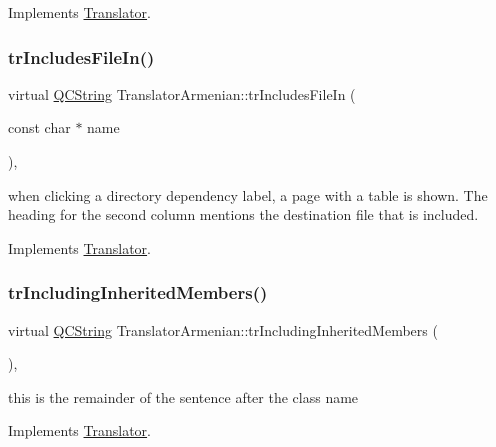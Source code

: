 Implements \mbox{\hyperlink{class_translator}{Translator}}.

\mbox{\label{class_translator_armenian_af2a4a618cdf3af2ac4be6779c2b79896}} 
\subsubsection{\texorpdfstring{trIncludesFileIn()}{trIncludesFileIn()}}
{\footnotesize\ttfamily virtual \mbox{\hyperlink{class_q_c_string}{Q\+C\+String}} Translator\+Armenian\+::tr\+Includes\+File\+In (\begin{DoxyParamCaption}\item[{const char $\ast$}]{name }\end{DoxyParamCaption})\hspace{0.3cm}{\ttfamily [inline]}, {\ttfamily [virtual]}}

when clicking a directory dependency label, a page with a table is shown. The heading for the second column mentions the destination file that is included. 

Implements \mbox{\hyperlink{class_translator}{Translator}}.

\mbox{\label{class_translator_armenian_a97f47188715dd990060fd63c25baaf94}} 
\subsubsection{\texorpdfstring{trIncludingInheritedMembers()}{trIncludingInheritedMembers()}}
{\footnotesize\ttfamily virtual \mbox{\hyperlink{class_q_c_string}{Q\+C\+String}} Translator\+Armenian\+::tr\+Including\+Inherited\+Members (\begin{DoxyParamCaption}{ }\end{DoxyParamCaption})\hspace{0.3cm}{\ttfamily [inline]}, {\ttfamily [virtual]}}

this is the remainder of the sentence after the class name 

Implements \mbox{\hyperlink{class_translator}{Translator}}.

